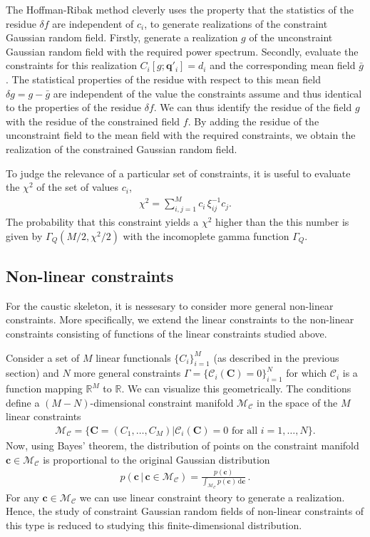 \documentclass[a4paper, 11pt]{article}
\begin{document}
The Hoffman-Ribak method cleverly uses the property that the statistics of the residue $\delta f$ are independent of $c_i$, to generate realizations of the constraint Gaussian random field. Firstly, generate a realization $g$ of the unconstraint Gaussian random field with the required power spectrum. Secondly, evaluate the constraints for this realization $C_i[g;\bm{q}'_i]=d_i$ and the corresponding mean field $\bar{g}$. The statistical properties of the residue with respect to this mean field $\delta g = g-\bar{g}$ are independent of the value the constraints assume and thus identical to the properties of the residue $\delta f$. We can thus identify the residue of the field $g$ with the residue of the constrained field $f$. By adding the residue of the unconstraint field to the mean field with the required constraints, we obtain the realization of the constrained Gaussian random field.

To judge the relevance of a particular set of constraints, it is useful to evaluate the $\chi^2$ of the set of values $c_i$,
\begin{align}
\chi^2 = \sum_{i,j=1}^M c_i\, \xi_{ij}^{-1}c_j.
\end{align}
The probability that this constraint yields a $\chi^2$ higher than the this number is given by $\Gamma_Q(M/2, \chi^2/2)$ with the incomoplete gamma function $\Gamma_Q$.


\subsection{Non-linear constraints}
For the caustic skeleton, it is nessesary to consider more general non-linear constraints. More specifically, we extend the linear constraints to the non-linear constraints consisting of functions of the linear constraints studied above.

Consider a set of $M$ linear functionals $\{C_i\}_{i=1}^M$ (as described in the previous section) and $N$ more general constraints $\Gamma = \{\mathcal{C}_i(\bm{C}) = 0\}_{i=1}^N$ for which $\mathcal{C}_i$ is a function mapping $\mathbb{R}^M$ to $\mathbb{R}$. We can visualize this geometrically. The conditions define a $(M-N)$-dimensional constraint manifold $\mathcal{M}_\mathcal{C}$ in the space of the $M$ linear constraints
\begin{align}
\mathcal{M}_{\mathcal{C}} = 
\{\bm{C} = (C_1,\dots,C_M)| \mathcal{C}_i(\bm{C}) = 0 \text{ for all } i=1,\dots,N\}.
\end{align}
Now, using Bayes' theorem, the distribution of points on the constraint manifold $\bm{c} \in \mathcal{M}_{\mathcal{C}}$ is proportional to the original Gaussian distribution
\begin{align}
p(\bm{c}\,|\,\bm{c}\in \mathcal{M}_{\mathcal{C}})  = \frac{p(\bm{c})}{\int_{\mathcal{M}_\mathcal{C}} p(\bm{c})\, \mathrm{d}\bm{c}}\,.
\end{align}
For any $\bm{c} \in \mathcal{M}_\mathcal{C}$ we can use linear constraint theory to generate a realization. Hence, the study of constraint Gaussian random fields of non-linear constraints of this type is reduced to studying this finite-dimensional distribution.
\end{document}
